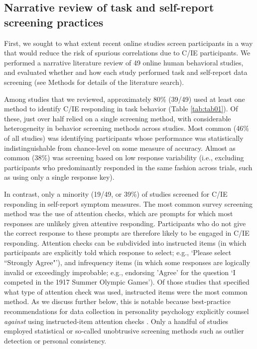 \documentclass[a4paper,notitlepage,12pt]{article}
\begin{document}
\subsection*{Narrative review of task and self-report screening practices}

First, we sought to what extent recent online studies screen participants in a way that would reduce the risk of spurious correlations due to C/IE participants. We performed a narrative literature review of 49 online human behavioral studies, and evaluated whether and how each study performed task and self-report data screening (see Methods for details of the literature search).

Among studies that we reviewed, approximately 80\% (39/49) used at least one method to identify C/IE responding in task behavior (Table \ref{tab:tab01}). Of these, just over half relied on a single screening method, with considerable heterogeneity in behavior screening methods across studies. Most common (46\% of all studies) was identifying participants whose performance was statistically indistinguishable from chance-level on some measure of accuracy. Almost as common (38\%) was screening based on low response variability (i.e., excluding participants who predominantly responded in the same fashion across trials, such as using only a single response key).

In contrast, only a minority (19/49, or 39\%) of studies screened for C/IE responding in self-report symptom measures. The most common survey screening method was the use of attention checks, which are prompts for which most responses are unlikely given attentive responding. Participants who do not give the correct response to these prompts are therefore likely to be engaged in C/IE responding. Attention checks can be subdivided into instructed items (in which participants are explicitly told which response to select; e.g., `Please select ``Strongly Agree"'), and infrequency items (in which some responses are logically invalid or exceedingly improbable; e.g., endorsing 'Agree' for the question `I competed in the 1917 Summer Olympic Games'). Of those studies that specified what type of attention check was used, instructed items were the most common method. As we discuss further below, this is notable because best-practice recommendations for data collection in personality psychology explicitly counsel \emph{against} using instructed-item attention checks \cite{barends2019noncompliant, thomas2017validity, hauser2016attentive}. Only a handful of studies employed statistical or so-called unobtrusive screening methods such as outlier detection or personal consistency. 
\end{document}
